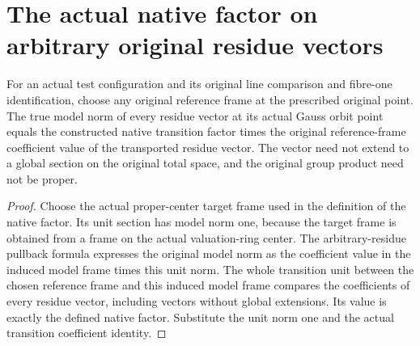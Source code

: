 \section{The actual native factor on arbitrary original residue vectors}

\begin{theorem}
\label{thm:pl-original-native-factor-arbitrary-residue-vector}
\leanok
{}
For an actual test configuration and its original line comparison and
fibre-one identification, choose any original reference frame at the
prescribed original point. The true model norm of every residue vector
at its actual Gauss orbit point equals the constructed native transition
factor times the original reference-frame coefficient value of the
transported residue vector. The vector need not extend to a global
section on the original total space, and the original group product
need not be proper.
\end{theorem}
\begin{proof}
Choose the actual proper-center target frame used in the definition of
the native factor. Its unit section has model norm one, because the
target frame is obtained from a frame on the actual valuation-ring
center. The arbitrary-residue pullback formula expresses the original
model norm as the coefficient value in the induced model frame times
this unit norm. The whole transition unit between the chosen reference
frame and this induced model frame compares the coefficients of every
residue vector, including vectors without global extensions. Its value
is exactly the defined native factor. Substitute the unit norm one
and the actual transition coefficient identity.
\end{proof}
